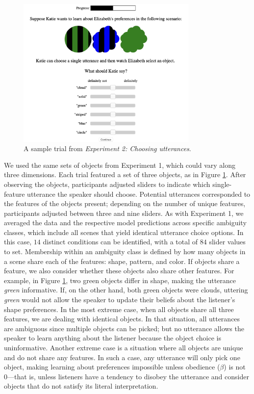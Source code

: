 \documentclass[10pt,a4paper]{article}
\begin{document}
\begin{figure}[ht]
	\centering
	\includegraphics[width=3.5in]{images/utterance-choice-trial.png}
	\caption{A sample trial from \emph{Experiment 2: Choosing utterances}. }\label{exp2-trial}
\end{figure} 

We used the same sets of objects from Experiment 1, which could vary along three dimensions. Each trial featured a set of three objects, as in Figure \ref{exp2-trial}. After observing the objects, participants adjusted sliders to indicate which single-feature utterance the speaker should choose. Potential utterances corresponded to the features of the objects present; depending on the number of unique features, participants adjusted between three and nine sliders. As with Experiment 1, we averaged the data and the respective model predictions across specific ambiguity classes, which include all scenes that yield identical utterance choice options. 
In this case, $14$ distinct conditions can be identified, with a total of $84$ slider values to set. 
Membership within an ambiguity class is defined by how many objects in a scene share each of the features: shape, pattern, and color. If objects share a feature, we also consider whether these objects also share other features. For example, in Figure \ref{exp2-trial}, two green objects differ in shape, making the utterance \textit{green} informative. If, on the other hand, both green objects were clouds, uttering \textit{green} would not allow the speaker to update their beliefs about the listener's shape preferences.
In the most extreme case, when all objects share all three features, we are dealing with identical objects. In that situation, all utterances are ambiguous since multiple objects can be picked; but no utterance allows the speaker to learn anything about the listener because the object choice is uninformative. Another extreme case is a situation where all objects are unique and do not share any features. In such a case, any utterance will only pick one object, making learning about preferences impossible unless obedience ($\beta$) is not 0---that is, unless listeners have a tendency to disobey the utterance and consider objects that do not satisfy its literal interpretation.
\end{document}

